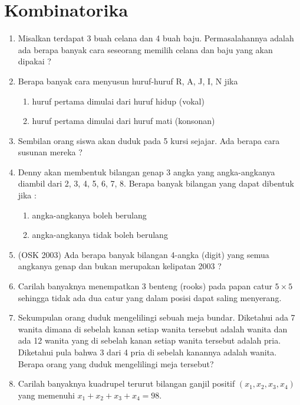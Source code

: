 \documentclass[11pt]{scrartcl}
\begin{document}
\section{Kombinatorika}
\begin{enumerate}
    \item Misalkan terdapat 3 buah celana dan 4 buah baju. Permasalahannya adalah ada berapa banyak cara 
seseorang memilih celana dan baju yang akan dipakai ?

    \item Berapa banyak cara menyusun huruf-huruf R, A, J, I, N jika 
\begin{enumerate}
    \item huruf pertama dimulai dari huruf hidup (vokal) 
    \item huruf pertama dimulai dari huruf mati (konsonan) 
\end{enumerate}

    \item Sembilan orang siswa akan duduk pada 5 kursi sejajar. Ada berapa cara susunan mereka ? 
    
    \item Denny akan membentuk bilangan genap 3 angka yang angka-angkanya diambil dari 2, 3, 4, 5, 6, 7, 8. 
Berapa banyak bilangan yang dapat dibentuk jika : 
    \begin{enumerate}
        \item angka-angkanya boleh berulang 
\item angka-angkanya tidak boleh berulang
    \end{enumerate}
    
    \item (OSK 2003) Ada berapa banyak bilangan 4-angka (digit) yang semua angkanya genap dan bukan 
merupakan kelipatan 2003 ?
    \item  Carilah banyaknya menempatkan 3 benteng (rooks) pada papan catur $5 \times 5$ sehingga
tidak ada dua catur yang dalam posisi dapat saling menyerang.

    \item Sekumpulan orang duduk mengelilingi sebuah meja bundar. Diketahui ada 7 wanita
dimana di sebelah kanan setiap wanita tersebut adalah wanita dan ada 12 wanita yang di
sebelah kanan setiap wanita tersebut adalah pria. Diketahui pula bahwa 3 dari 4 pria di
sebelah kanannya adalah wanita. Berapa orang yang duduk mengelilingi meja tersebut?

    \item Carilah banyaknya kuadrupel terurut bilangan ganjil positif $(x_1, x_2, x_3, x_4)$ yang memenuhi
$x_1 + x_2 + x_3 + x_4 = 98$.


\end{enumerate}
\end{document}
